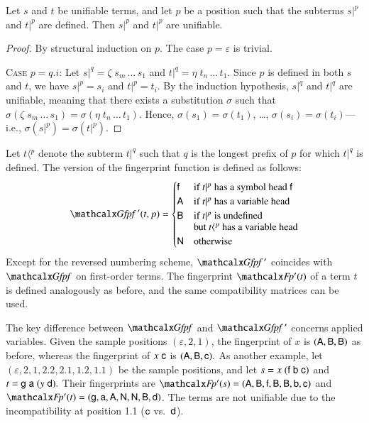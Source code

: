 \begin{lemma}\label{lemma:fpindex-aux}
  Let $s$ and $t$ be unifiable terms, and let $p$ be a position such that the
  subterms $s|^{p}$ and $t|^{p}$ are defined. Then $s|^{p}$ and $t|^{p}$ are
  unifiable.
\end{lemma}
\begin{proof}
  By structural induction on $p$. The case $p = \varepsilon$ is trivial.

  \medskip

  \noindent
  \textsc{Case $p = q.i$}:\enskip
  Let $s|^{q} = \zeta \; s_m \, \ldots \, s_1$ and $t|^{q} = \eta \; t_n \, \ldots \, t_1$.
  Since $p$ is defined in both $s$ and $t$, we have
   $s|^{p} = s_i$ and $t|^{p} = t_i$.
  By the induction hypothesis, $s|^{q}$ and $t|^{q}$ are
  unifiable, meaning that there exists a substitution $\sigma$
  such that $\sigma(\zeta \; s_m \, \ldots \, s_1) = \sigma(\eta \; t_n \, \ldots \, t_1)$.
  Hence, $\sigma(s_1) = \sigma(t_1)$, \ldots, $\sigma(s_i) = \sigma(t_i)$---i.e.,
  $\sigma(s|^{p}) = \sigma(t|^{p})$.
\end{proof}

Let $t{\langle}{}^p$ denote the subterm $t{|}^q$ such that $q$ is the longest
prefix of $p$ for which $t{|}^q$ is defined.
%
The \lfhol{} version of the fingerprint function is defined as follows:
%
\[
  \GfpfRTL(t,p) =
  \begin{cases}
    \cst{f} & \text{if $t|^p$ has a symbol head $\cst{f}$} \\
    \AA & \text{if $t|^p$ has a variable head} \\
    \BB & \text{if $t|^p$ is undefined} \\[-\jot]
        & \text{but $t{\langle}{}^p$ has a variable head} \\
    \NN & \text{otherwise}
  \end{cases}
\]
%
Except for the reversed numbering scheme,
$\GfpfRTL$ coincides with $\Gfpf$ on first-order terms.
The fingerprint $\FpRTL(t)$ of a term $t$ is defined analogously as before,
and the same compatibility matrices can be used.

The key difference between $\Gfpf$ and $\GfpfRTL$ concerns applied variables.
Given the sample positions $(\varepsilon, 2, 1)$,
the fingerprint of $x$ is $({\textsf{A}}, {\textsf{B}}, {\textsf{B}})$ as before, whereas
the fingerprint of $x \; \mathsf{c}$ is $({\textsf{A}}, {\textsf{B}}, \mathsf{c}).$
%
As another example,
let $(\varepsilon, 2,\allowbreak 1,\allowbreak 2.2,\allowbreak 2.1,\allowbreak 1.2, 1.1)$
be the sample positions,
and let $s = x \; (\mathsf{f} \; \mathsf{b} \; \mathsf{c})$ and $t = \mathsf{g}\; \mathsf{a}\; (y \; \mathsf{d}).$
Their fingerprints are
$\FpRTL(s) = (\AA, \BB, \cst{f}, \BB, \BB, \cst{b}, \cst{c})$ and
$\FpRTL(t) = (\cst{g}, \cst{a}, \AA, \NN, \NN, \BB, \cst{d})$.
%
The terms are not unifiable due to the incompatibility at position 1.1
($\mathsf{c}$ vs.~$\mathsf{d}$).

